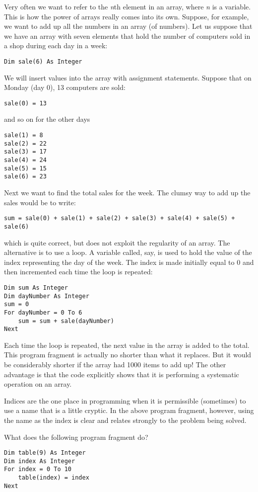 		Very often we want to refer to the \emph{n}th element in an array, where \emph{n} is a variable. This is how the power of arrays really comes into its own. Suppose, for example, we want to add up all the numbers in an array (of numbers). Let us suppose that we have an array with seven elements that hold the number of computers sold in a shop during each day in a week:
		\begin{lstlisting}
Dim sale(6) As Integer
		\end{lstlisting}
		We will insert values into the array with assignment statements. Suppose that on Monday (day 0), 13 computers are sold:
		\begin{lstlisting}
sale(0) = 13
		\end{lstlisting}
		and so on for the other days
		\begin{lstlisting}
sale(1) = 8
sale(2) = 22
sale(3) = 17
sale(4) = 24
sale(5) = 15
sale(6) = 23
		\end{lstlisting}
		Next we want to find the total sales for the week. The clumsy way to add up the sales would be to write:
		\begin{lstlisting}
sum = sale(0) + sale(1) + sale(2) + sale(3) + sale(4) + sale(5) + sale(6)
		\end{lstlisting}
		which is quite correct, but does not exploit the regularity of an array. The alternative is to use a  loop. A variable called, say,  is used to hold the value of the index representing the day of the week. The index is made initially equal to 0 and then incremented each time the loop is repeated:
		\begin{lstlisting}
Dim sum As Integer
Dim dayNumber As Integer
sum = 0
For dayNumber = 0 To 6
	sum = sum + sale(dayNumber)
Next
		\end{lstlisting}
		Each time the loop is repeated, the next value in the array is added to the total. This program fragment is actually no shorter than what it replaces. But it would be considerably shorter if the array had 1000 items to add up! The other advantage is that the code explicitly shows that it is performing a systematic operation on an array.
		
		Indices are the one place in programming when it is permissible (sometimes) to use a name that is a little cryptic. In the above program fragment, however, using the name  as the index is clear and relates strongly to the problem being solved.

		\begin{stqb}
			\begin{STQ}
				\item	What does the following program fragment do?
					\begin{lstlisting}
Dim table(9) As Integer
Dim index As Integer
For index = 0 To 10
	table(index) = index
Next
					\end{lstlisting}
			\end{STQ}
		\end{stqb}



